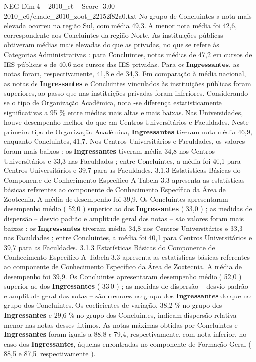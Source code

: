 \begin{textsample}{NEG Dim 4 – 2010\_c6 – Score -3.00 – 2010\_c6/enade\_2010\_zoot\_22152f82a0.txt}
No grupo de Concluintes a nota mais elevada ocorreu na região Sul, com média 49,3.
A menor nota média foi 42,6, correspondente aos Concluintes da região Norte.
As instituições públicas obtiveram médias mais elevadas do que as privadas, no que se refere às Categorias Administrativas : para Concluintes, notas médias de 47,2 em cursos de IES públicas e de 40,6 nos cursos das IES privadas.
Para os \textbf{Ingressantes}, as notas foram, respectivamente, 41,8 e de 34,3.
Em comparação à média nacional, as notas de \textbf{Ingressantes} e Concluintes vinculados às instituições públicas foram superiores, ao passo que nas instituições privadas foram inferiores.
Considerando -se o tipo de Organização Acadêmica, nota -se diferença estatisticamente significativas a 95 \% entre médias mais altas e mais baixas.
Nas Universidades, houve desempenho melhor do que em Centros Universitários e Faculdades.
Neste primeiro tipo de Organização Acadêmica, \textbf{Ingressantes} tiveram nota média 46,9, enquanto Concluintes, 41,7.
Nos Centros Universitários e Faculdades, os valores foram mais baixos : os \textbf{Ingressantes} tiveram média 34,8 nos Centros Universitários e 33,3 nas Faculdades ; entre Concluintes, a média foi 40,1 para Centros Universitários e 39,7 para as Faculdades. 3.1.3 Estatísticas Básicas do Componente de Conhecimento Específico A Tabela 3.3 apresenta as estatísticas básicas referentes ao componente de Conhecimento Específico da Área de Zootecnia.
A média de desempenho foi 39,9.
Os Concluintes apresentaram desempenho médio ( 52,0 ) superior ao dos \textbf{Ingressantes} ( 33,0 ) ; as medidas de dispersão – desvio padrão e amplitude geral das notas – são valores foram mais baixos : os \textbf{Ingressantes} tiveram média 34,8 nos Centros Universitários e 33,3 nas Faculdades ; entre Concluintes, a média foi 40,1 para Centros Universitários e 39,7 para as Faculdades. 3.1.3 Estatísticas Básicas do Componente de Conhecimento Específico A Tabela 3.3 apresenta as estatísticas básicas referentes ao componente de Conhecimento Específico da Área de Zootecnia.
A média de desempenho foi 39,9.
Os Concluintes apresentaram desempenho médio ( 52,0 ) superior ao dos \textbf{Ingressantes} ( 33,0 ) ; as medidas de dispersão – desvio padrão e amplitude geral das notas – são menores no grupo dos \textbf{Ingressantes} do que no grupo dos Concluintes.
Os coeficientes de variação, 38,2 \% no grupo dos \textbf{Ingressantes} e 29,6 \% no grupo dos Concluintes, indicam dispersão relativa menor nas notas desses últimos.
As notas máximas obtidas por Concluintes e \textbf{Ingressantes} foram iguais a 88,8 e 79,4, respectivamente, com nota inferior, no caso dos \textbf{Ingressantes}, àquelas encontradas no componente de Formação Geral ( 88,5 e 87,5, respectivamente ).

\end{textsample}
